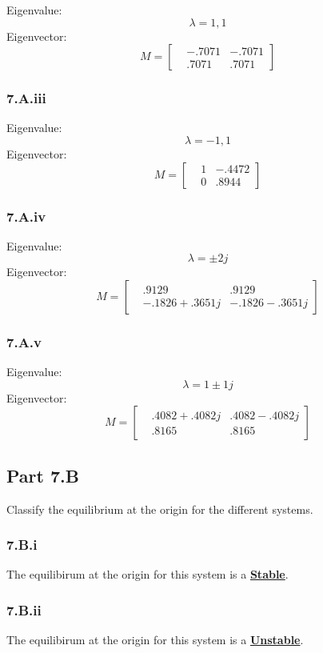 Eigenvalue:
$$ \lambda = 1, 1 $$
Eigenvector:
$$M =
\begin{bmatrix}
    & -.7071 & -.7071 \\
    & .7071 & .7071
\end{bmatrix}
$$
\subsubsection*{7.A.iii}

Eigenvalue:
$$ \lambda = -1, 1 $$
Eigenvector:
$$M =
\begin{bmatrix}
    & 1 & -.4472 \\
    & 0 & .8944
\end{bmatrix}
$$
\subsubsection*{7.A.iv}

Eigenvalue:
$$ \lambda = \pm2j $$
Eigenvector:
$$M =
\begin{bmatrix}
    & .9129 & .9129 \\
    & -.1826 + .3651j & -.1826 - .3651j
\end{bmatrix}
$$
\subsubsection*{7.A.v}

Eigenvalue:
$$ \lambda = 1\pm1j $$
Eigenvector:
$$M =
\begin{bmatrix}
    & .4082+.4082j & .4082-.4082j \\
    & .8165 & .8165
\end{bmatrix}
$$

\subsection*{Part 7.B}
Classify the equilibrium at the origin for the different systems.
\subsubsection*{7.B.i}
The equilibirum at the origin for this system is a \underline{\textbf{Stable}}.

\subsubsection*{7.B.ii}
The equilibirum at the origin for this system is a \underline{\textbf{Unstable}}.

